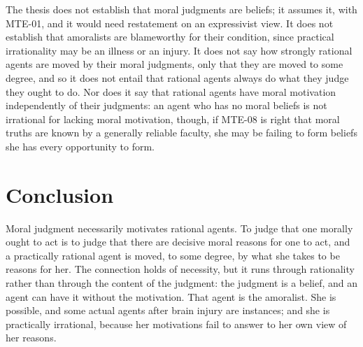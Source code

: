 \documentclass{situationist-preprint}
\begin{document}
The thesis does not establish that moral judgments are beliefs; it assumes it, with MTE-01, and it would need restatement on an expressivist view. It does not establish that amoralists are blameworthy for their condition, since practical irrationality may be an illness or an injury. It does not say how strongly rational agents are moved by their moral judgments, only that they are moved to some degree, and so it does not entail that rational agents always do what they judge they ought to do. Nor does it say that rational agents have moral motivation independently of their judgments: an agent who has no moral beliefs is not irrational for lacking moral motivation, though, if MTE-08 is right that moral truths are known by a generally reliable faculty, she may be failing to form beliefs she has every opportunity to form.

\section{Conclusion}

Moral judgment necessarily motivates rational agents. To judge that one morally ought to act is to judge that there are decisive moral reasons for one to act, and a practically rational agent is moved, to some degree, by what she takes to be reasons for her. The connection holds of necessity, but it runs through rationality rather than through the content of the judgment: the judgment is a belief, and an agent can have it without the motivation. That agent is the amoralist. She is possible, and some actual agents after brain injury are instances; and she is practically irrational, because her motivations fail to answer to her own view of her reasons.
\end{document}
